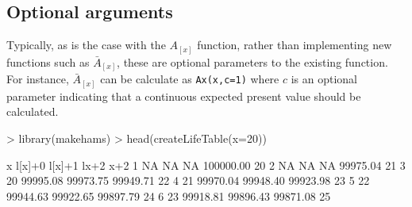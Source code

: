 \documentclass{report}
\begin{document}
\subsection*{Optional arguments}
Typically, as is the case with the $A_{[x]}$ function, rather than implementing new functions such as $\bar{A}_{[x]}$, these are optional parameters to the existing function. For instance, $\bar{A}_{[x]}$ can be calculate as \texttt{Ax(x,c=1)} where $c$ is an optional parameter indicating that a continuous expected present value should be calculated.

\begin{Schunk}
\begin{Sinput}
> library(makehams)
> head(createLifeTable(x=20))
\end{Sinput}
\begin{Soutput}
   x   l[x]+0   l[x]+1      lx+2 x+2
1 NA       NA       NA 100000.00  20
2 NA       NA       NA  99975.04  21
3 20 99995.08 99973.75  99949.71  22
4 21 99970.04 99948.40  99923.98  23
5 22 99944.63 99922.65  99897.79  24
6 23 99918.81 99896.43  99871.08  25
\end{Soutput}
\end{Schunk}

\end{document}
